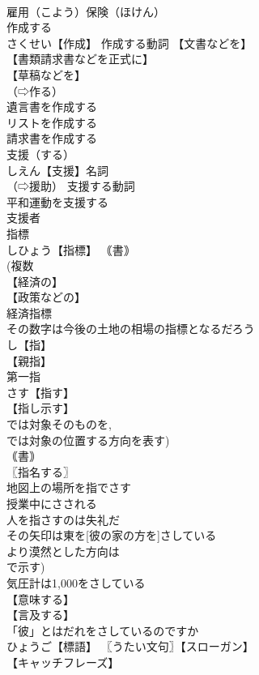 \documentclass[8pt]{extreport}
\begin{document}
\begin{CJK}{UTF8}{min}
\\	雇用（こよう）保険（ほけん） 
\\	作成する		
\\	さくせい【作成】 作成する動詞 【文書などを】
\\	【書類請求書などを正式に】
\\	【草稿などを】
\\	（⇨作る） 
\\	遺言書を作成する 
\\	リストを作成する 
\\	請求書を作成する 
\\	支援（する）		
\\	しえん【支援】名詞 
\\	（⇨援助） 支援する動詞 
\\	平和運動を支援する 
\\	支援者 
\\	指標		
\\	しひょう【指標】 ｟書｠
\\	(複数 
\\	【経済の】
\\	【政策などの】
\\	経済指標 
\\	その数字は今後の土地の相場の指標となるだろう 
\\	し【指】 
\\	【親指】
\\	第一指 
\\	さす【指す】 
\\	【指し示す】 
\\	では対象そのものを, 
\\	では対象の位置する方向を表す) 
\\	｟書｠
\\	〖指名する〗
\\	地図上の場所を指でさす 
\\	授業中にさされる 
\\	人を指さすのは失礼だ 
\\	その矢印は東を[彼の家の方を]さしている 
\\	より漠然とした方向は 
\\	で示す) 
\\	気圧計は1,000をさしている 
\\	【意味する】 
\\	【言及する】
\\	「彼」とはだれをさしているのですか 
\\	ひょうご【標語】 〖うたい文句〗【スローガン】
\\	【キャッチフレーズ】

\end{CJK}
\end{document}
